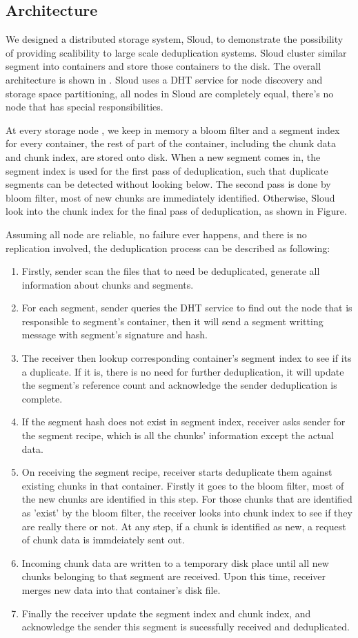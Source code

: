 \subsection{Architecture}
We designed a distributed storage system, Sloud, to demonstrate the possibility of
providing scalibility to large scale deduplication systems. Sloud cluster similar segment into containers and store
those containers to the disk. The overall architecture is shown in .
Sloud uses a DHT service for node discovery and storage space partitioning, all nodes in Sloud are completely equal, 
there's no node that has special responsibilities.

At every storage node , we keep in memory a bloom filter and a segment index for every container, 
the rest of part of the container, including the chunk data and chunk index, are stored onto disk. When a new segment comes in, the segment index is used
for the first pass of deduplication, such that duplicate segments can be detected without looking below. The second pass is done by bloom filter,
most of new chunks are immediately identified. Otherwise, Sloud look into the chunk index for the final pass of deduplication, as shown in Figure.

Assuming all node are reliable, no failure ever happens, and there is no replication involved, 
the deduplication process can be described as following:
\begin{enumerate}
\item Firstly,  sender scan the files that to need be deduplicated, generate all information about chunks and segments.
\item For each segment, sender queries the DHT service to find out the node that is responsible to segment's container, then it will send a segment writting message with segment's signature and hash.
\item The receiver then lookup corresponding container's segment index to see if its a duplicate. If it is, there is no need for further deduplication, it will update the segment's reference count and acknowledge the sender deduplication is complete.
\item If the segment hash does not exist in segment index, receiver asks sender for the segment recipe, which is all the chunks' information except the actual data.
\item On receiving the segment recipe, receiver starts deduplicate them against existing chunks in that container. Firstly it goes to the bloom filter, most of the new chunks are identified in this step. For those chunks that are identified as 'exist' by the bloom filter, the receiver looks into chunk index to see if they are really there or not. At any step, if a chunk is identified as new, a request of chunk data is immdeiately sent out.
\item Incoming chunk data are written to a temporary disk place until all new chunks belonging to that segment are received. Upon this time, receiver merges new data into that container's disk file.
\item Finally the receiver update the segment index and chunk index, and acknowledge the sender this segment is sucessfully received and deduplicated.
\end{enumerate}


